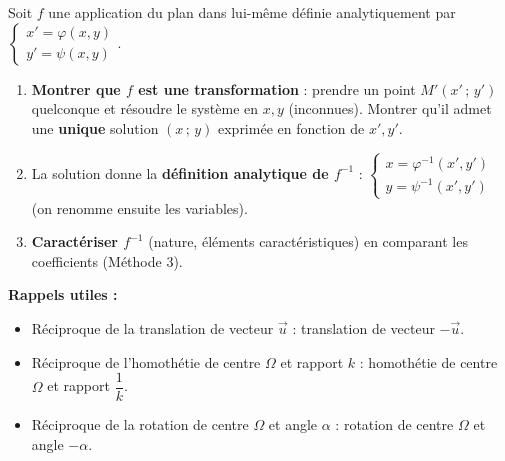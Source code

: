 \documentclass[11pt]{article}
\begin{document}
\begin{methode}
Soit $f$ une application du plan dans lui-même définie analytiquement par $\begin{cases} x' = \varphi(x,y) \\ y' = \psi(x,y) \end{cases}$.
\begin{enumerate}
\item \textbf{Montrer que $f$ est une transformation} : prendre un point $M'(x'\,;\,y')$ quelconque et résoudre le système en $x,y$ (inconnues). Montrer qu'il admet une \textbf{unique} solution $(x\,;\,y)$ exprimée en fonction de $x',y'$.
\item La solution donne la \textbf{définition analytique de $f^{-1}$} : $\begin{cases} x = \varphi^{-1}(x',y') \\ y = \psi^{-1}(x',y') \end{cases}$ (on renomme ensuite les variables).
\item \textbf{Caractériser $f^{-1}$} (nature, éléments caractéristiques) en comparant les coefficients (Méthode 3).
\end{enumerate}
\textbf{Rappels utiles :}
\begin{itemize}
\item Réciproque de la translation de vecteur $\vec{u}$ : translation de vecteur $-\vec{u}$.
\item Réciproque de l'homothétie de centre $\Omega$ et rapport $k$ : homothétie de centre $\Omega$ et rapport $\dfrac{1}{k}$.
\item Réciproque de la rotation de centre $\Omega$ et angle $\alpha$ : rotation de centre $\Omega$ et angle $-\alpha$.
\end{itemize}
\end{methode}
\end{document}
